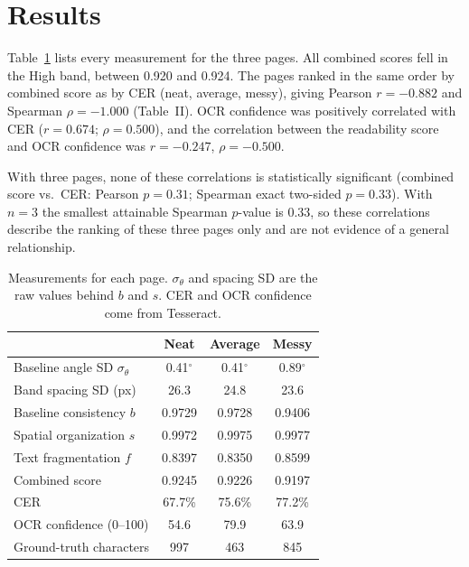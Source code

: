 
\section{Results}

Table~\ref{tab:raw} lists every measurement for the three pages. All combined
scores fell in the High band, between 0.920 and 0.924. The pages ranked in the
same order by combined score as by CER (neat, average, messy), giving Pearson
$r = -0.882$ and Spearman $\rho = -1.000$ (Table~II). OCR confidence was
positively correlated with CER ($r = 0.674$; $\rho = 0.500$), and the
correlation between the readability score and OCR confidence was
$r = -0.247$, $\rho = -0.500$.

With three pages, none of these correlations is statistically significant
(combined score vs.\ CER: Pearson $p = 0.31$; Spearman exact two-sided
$p = 0.33$). With $n = 3$ the smallest attainable Spearman $p$-value is 0.33,
so these correlations describe the ranking of these three pages only and are
not evidence of a general relationship.

\begin{table}[t]
  \centering
  \caption{Measurements for each page. $\sigma_\theta$ and spacing SD are the
  raw values behind $b$ and $s$. CER and OCR confidence come from Tesseract.}
  \label{tab:raw}
  \begin{tabular}{@{}lccc@{}}
    \toprule
                                   & Neat   & Average & Messy  \\
    \midrule
    Baseline angle SD $\sigma_\theta$ & 0.41$^\circ$ & 0.41$^\circ$ & 0.89$^\circ$ \\
    Band spacing SD (px)           & 26.3   & 24.8    & 23.6   \\
    Baseline consistency $b$       & 0.9729 & 0.9728  & 0.9406 \\
    Spatial organization $s$       & 0.9972 & 0.9975  & 0.9977 \\
    Text fragmentation $f$         & 0.8397 & 0.8350  & 0.8599 \\
    Combined score                 & 0.9245 & 0.9226  & 0.9197 \\
    \midrule
    CER                            & 67.7\% & 75.6\%  & 77.2\%  \\
    OCR confidence (0--100)        & 54.6   & 79.9    & 63.9    \\
    Ground-truth characters        & 997    & 463     & 845     \\
    \bottomrule
  \end{tabular}
\end{table}

